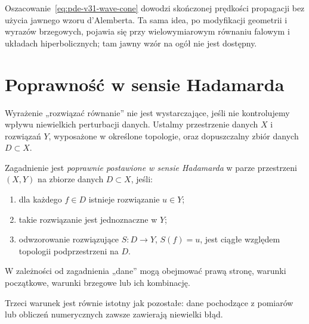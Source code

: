 \begin{uwaga}
Oszacowanie~\eqref{eq:pde-v31-wave-cone} dowodzi skończonej
prędkości propagacji bez użycia jawnego wzoru d'Alemberta.
Ta sama idea, po modyfikacji geometrii i wyrazów brzegowych,
pojawia się przy wielowymiarowym równaniu falowym i układach
hiperbolicznych; tam jawny wzór na ogół nie jest dostępny.
\end{uwaga}

\section{Poprawność w sensie Hadamarda}
\label{sec:pde-hadamard}

Wyrażenie „rozwiązać równanie” nie jest wystarczające,
jeśli nie kontrolujemy wpływu niewielkich perturbacji danych.
Ustalmy przestrzenie danych $X$ i rozwiązań $Y$, wyposażone
w określone topologie, oraz dopuszczalny zbiór danych
$D\subset X$.

\begin{definicja}
Zagadnienie jest \emph{poprawnie postawione w sensie Hadamarda}
w parze przestrzeni $(X,Y)$ na zbiorze danych $D\subset X$,
jeśli:
\begin{enumerate}
\item dla każdego $f\in D$ istnieje rozwiązanie $u\in Y$;
\item takie rozwiązanie jest jednoznaczne w $Y$;
\item odwzorowanie rozwiązujące $S\colon D\to Y$, $S(f)=u$,
jest ciągłe względem topologii podprzestrzeni na $D$.
\end{enumerate}
W zależności od zagadnienia „dane” mogą obejmować prawą stronę,
warunki początkowe, warunki brzegowe lub ich kombinację.
\end{definicja}

Trzeci warunek jest równie istotny jak pozostałe: dane
pochodzące z pomiarów lub obliczeń numerycznych zawsze
zawierają niewielki błąd.

